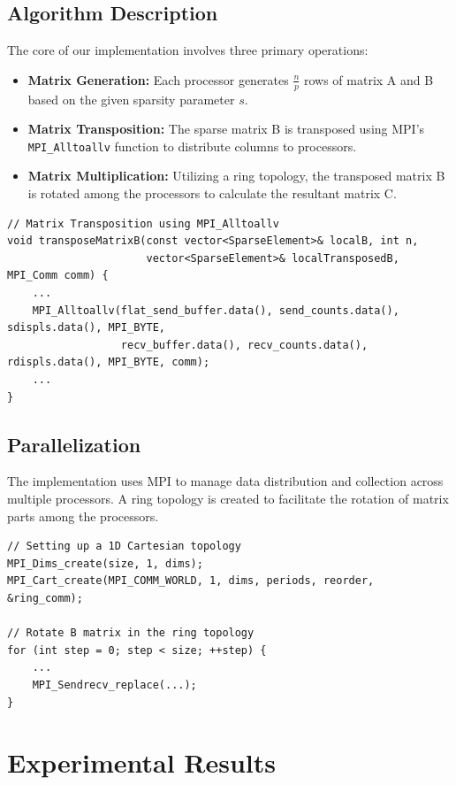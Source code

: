 \documentclass{article}
\begin{document}
\subsection{Algorithm Description}
The core of our implementation involves three primary operations:
\begin{itemize}
    \item \textbf{Matrix Generation:} Each processor generates \(\frac{n}{p}\) rows of matrix A and B based on the given sparsity parameter \(s\).
    \item \textbf{Matrix Transposition:} The sparse matrix B is transposed using MPI's \texttt{MPI\_Alltoallv} function to distribute columns to processors.
    \item \textbf{Matrix Multiplication:} Utilizing a ring topology, the transposed matrix B is rotated among the processors to calculate the resultant matrix C.
\end{itemize}

\begin{verbatim}
// Matrix Transposition using MPI_Alltoallv
void transposeMatrixB(const vector<SparseElement>& localB, int n, 
                      vector<SparseElement>& localTransposedB, MPI_Comm comm) {
    ...
    MPI_Alltoallv(flat_send_buffer.data(), send_counts.data(), sdispls.data(), MPI_BYTE,
                  recv_buffer.data(), recv_counts.data(), rdispls.data(), MPI_BYTE, comm);
    ...
}
\end{verbatim}

\subsection{Parallelization}
The implementation uses MPI to manage data distribution and collection across multiple processors. A ring topology is created to facilitate the rotation of matrix parts among the processors.

\begin{verbatim}
// Setting up a 1D Cartesian topology
MPI_Dims_create(size, 1, dims);
MPI_Cart_create(MPI_COMM_WORLD, 1, dims, periods, reorder, &ring_comm);

// Rotate B matrix in the ring topology
for (int step = 0; step < size; ++step) {
    ...
    MPI_Sendrecv_replace(...);
}
\end{verbatim}


\section{Experimental Results}
\end{document}
